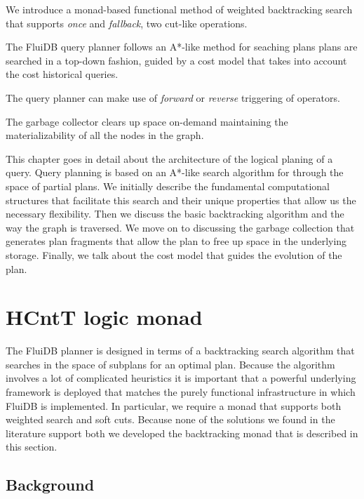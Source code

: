 
\begin{summary}
\item We introduce a monad-based functional method of weighted
  backtracking search that supports \emph{once} and \emph{fallback},
  two cut-like operations.
\item The FluiDB query planner follows an A*-like method for seaching plans
  plans are searched in a top-down fashion, guided by a cost model that
  takes into account the cost historical queries.
\item The query planner can make use of \emph{forward} or
  \emph{reverse} triggering of operators.
\item The garbage collector clears up space on-demand maintaining the
  materializability of all the nodes in the graph.
\end{summary}

This chapter goes in detail about the architecture of the logical
planing of a query. Query planning is based on an A*-like search
algorithm for through the space of partial plans. We initially
describe the fundamental computational structures that facilitate this
search and their unique properties that allow us the necessary
flexibility. Then we discuss the basic backtracking algorithm and the
way the graph is traversed. We move on to discussing the garbage
collection that generates plan fragments that allow the plan to free
up space in the underlying storage. Finally, we talk about the cost
model that guides the evolution of the plan.

\section{HCntT logic monad}

The FluiDB planner is designed in terms of a backtracking search
algorithm that searches in the space of subplans for an optimal 
plan. Because the algorithm involves a lot of complicated
heuristics it is important that a powerful underlying framework is
deployed that matches the purely functional infrastructure in which
FluiDB is implemented.  In particular, we require a monad that supports both weighted
search and soft cuts. Because none of the solutions we found in the
literature support both we developed the  backtracking monad
that is described in this section.

\subsection{Background}

